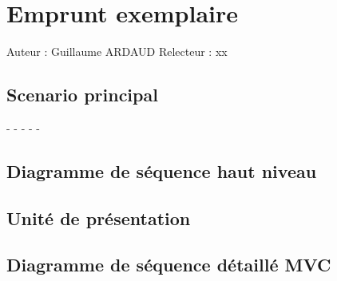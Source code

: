 \documentclass[a4paper,10pt]{report}
\begin{document}
\newpage


\chapter*{Emprunt exemplaire}

Auteur : Guillaume ARDAUD
Relecteur : xx

\bigskip
\section*{Scenario principal}
\begin{flushleft}
-
-
-
-
-
\end{flushleft}

\bigskip

\section*{Diagramme de séquence haut niveau}

\newpage

\section*{Unité de présentation}

\section*{Diagramme de séquence détaillé MVC}

\newpage

\end{document}
